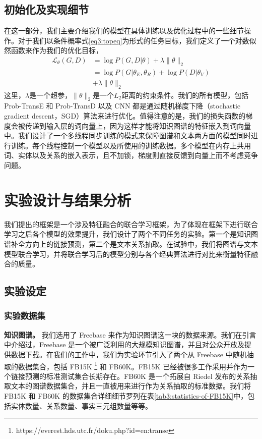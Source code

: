 \subsection{初始化及实现细节}
\label{sec3:detail}
在这一部分，我们主要介绍我们的模型在具体训练以及优化过程中的一些细节操作。对于我们以条件概率式\ref{eq3:topeq}为形式的任务目标，我们定义了一个对数似然函数来作为我们的优化目标，
\begin{align}
\mathcal{L}_{\theta}(G, D) & = \log P(G,D|{\theta}) + \lambda \lVert \theta \rVert_2 \\\nonumber
 & = \log P(G|{\theta_E, \theta_R}) + \log P(D|{\theta_V}) \\\nonumber
 & + \lambda \lVert \theta \rVert_2
\end{align}
这里，$\lambda$是一个超参，$\lVert \theta \rVert_2$是一个$L_2$距离的约束条件。我们的所有模型，包括 Prob-TransE 和 Prob-TransD 以及 CNN 都是通过随机梯度下降（stochastic gradient descent，SGD）算法来进行优化。值得注意的是，我们的损失函数的梯度会被传递到输入层的词向量上，因为这样才能将知识图谱的特征嵌入到词向量中。我们设计了一个多线程同步训练的模式来保障图谱和文本两方面的模型同时进行训练。每个线程控制一个模型以及所使用的训练数据。多个模型在内存上共用词、实体以及关系的嵌入表示，且不加锁，梯度则直接反馈到向量上而不考虑竞争问题。

\section{实验设计与结果分析}

我们提出的框架是一个涉及特征融合的联合学习框架，为了体现在框架下进行联合学习之后各个模型的效果提升，我们设计了两个不同任务的实验。第一个是知识图谱补全方向上的链接预测，第二个是文本关系抽取。在试验中，我们将图谱与文本模型联合学习，并将联合学习后的模型分别与各个经典算法进行对比来衡量特征融合的质量。

\subsection{实验设定}

\subsubsection{实验数据集}


\textbf{知识图谱。} 我们选用了 Freebase \cite{bollacker2008freebase} 来作为知识图谱这一块的数据来源。我们在引言中介绍过，Freebase 是一个被广泛利用的大规模知识图谱，并且对公众开放及提供数据下载。在我们的工作中，我们为实验环节引入了两个从 Freebase 中随机抽取的数据集合，包括 FB15K \footnote{https://everest.hds.utc.fr/doku.php?id=en:transe} 和 FB60K。FB15K 已经被很多工作采用并作为一个链接预测的标准测试集合长期存在。FB60K 是一个拓展自 Riedel \cite{riedel2010modeling} 发布的关系抽取文本的图谱数据集合，并且一直被用来进行作为关系抽取的标准数据。我们将 FB15K 和 FB60K 的数据集合详细细节罗列在表\ref{tab3:statistics-of-FB15K}中，包括实体数量、关系数量、事实三元组数量等等。

